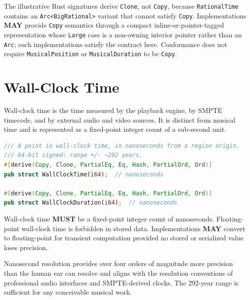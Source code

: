 \documentclass[11pt,letterpaper]{report}
\newcounter{requirement}[chapter]
\newcommand{\MUST}{\textbf{MUST}}
\newcommand{\MAY}{\textbf{MAY}}
\begin{document}
\begin{rationale}
  The illustrative Rust signatures derive \texttt{Clone}, not
  \texttt{Copy}, because \texttt{RationalTime} contains an
  \texttt{Arc<BigRational>} variant that cannot satisfy
  \texttt{Copy}. Implementations \MAY{} provide \texttt{Copy}
  semantics through a compact inline-or-pointer-tagged representation
  whose \texttt{Large} case is a non-owning interior pointer rather
  than an \texttt{Arc}; such implementations satisfy the contract
  here. Conformance does not require \texttt{MusicalPosition} or
  \texttt{MusicalDuration} to be \texttt{Copy}.
\end{rationale}

\section{Wall-Clock Time}
\label{sec:time:wallclock}

Wall-clock time is the time measured by the playback engine, by SMPTE
timecode, and by external audio and video sources. It is distinct from
musical time and is represented as a fixed-point integer count of a
sub-second unit.

\begin{lstlisting}[language=Rust]
/// A point in wall-clock time, in nanoseconds from a region origin.
/// 64-bit signed: range +/- ~292 years.
#[derive(Copy, Clone, PartialEq, Eq, Hash, PartialOrd, Ord)]
pub struct WallClockTime(i64);  // nanoseconds

#[derive(Copy, Clone, PartialEq, Eq, Hash, PartialOrd, Ord)]
pub struct WallClockDuration(i64);  // nanoseconds
\end{lstlisting}

\begin{requirement}
  \label{req:time:nanosecond-wallclock}
  Wall-clock time \MUST{} be a fixed-point integer count of
  nanoseconds. Floating-point wall-clock time is forbidden in stored
  data. Implementations \MAY{} convert to floating-point for transient
  computation provided no stored or serialized value loses precision.
\end{requirement}

\begin{rationale}
  Nanosecond resolution provides over four orders of magnitude more
  precision than the human ear can resolve and aligns with the
  resolution conventions of professional audio interfaces and
  SMPTE-derived clocks. The 292-year range is sufficient for any
  conceivable musical work.
\end{rationale}
\end{document}
